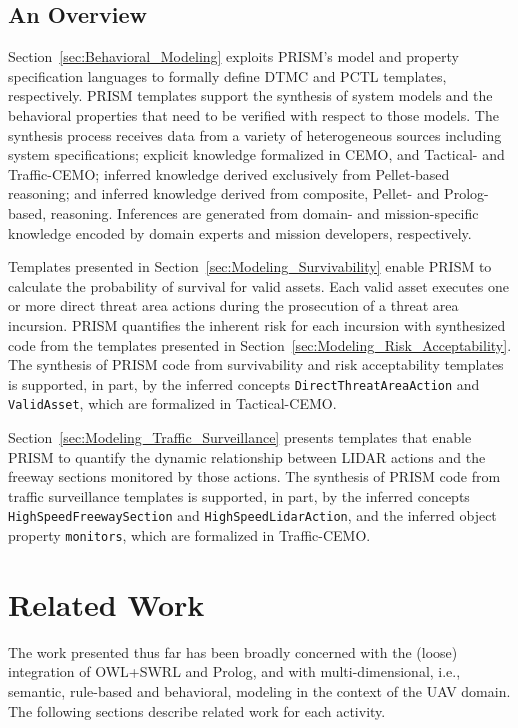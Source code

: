 \subsection{An Overview}

Section~\ref{sec:Behavioral_Modeling} exploits PRISM's model and property specification languages to formally define DTMC and PCTL templates, respectively. PRISM templates support the synthesis of system models and the behavioral properties that need to be verified with respect to those models. The synthesis process receives data from a variety of heterogeneous sources including system specifications; explicit knowledge formalized in CEMO, and Tactical- and Traffic-CEMO; inferred knowledge derived exclusively from Pellet-based reasoning; and inferred knowledge derived from composite, Pellet- and Prolog-based, reasoning. Inferences are generated from domain- and mission-specific knowledge encoded by domain experts and mission developers, respectively.

Templates presented in Section~\ref{sec:Modeling_Survivability} enable PRISM to calculate the probability of survival for valid assets. Each valid asset executes one or more direct threat area actions during the prosecution of a threat area incursion. PRISM quantifies the inherent risk for each incursion with synthesized code from the templates presented in Section~\ref{sec:Modeling_Risk_Acceptability}. The synthesis of PRISM code from survivability and risk acceptability templates is supported, in part, by the inferred concepts \texttt{DirectThreatAreaAction} and \texttt{ValidAsset}, which are formalized in Tactical-CEMO\@.

Section~\ref{sec:Modeling_Traffic_Surveillance} presents templates that enable PRISM to quantify the dynamic relationship between LIDAR actions and the freeway sections monitored by those actions. The synthesis of PRISM code from traffic surveillance templates is supported, in part, by the inferred concepts \texttt{HighSpeedFreewaySection} and \texttt{HighSpeedLidarAction}, and the inferred object property \texttt{monitors}, which are formalized in Traffic-CEMO\@.

\section{Related Work}
\label{sec:Domain_Modeling_Related_Work}

The work presented thus far has been broadly concerned with the (loose) integration of OWL+SWRL and Prolog, and with multi-dimensional, i.e., semantic, rule-based and behavioral, modeling in the context of the UAV domain. The following sections describe related work for each activity.

